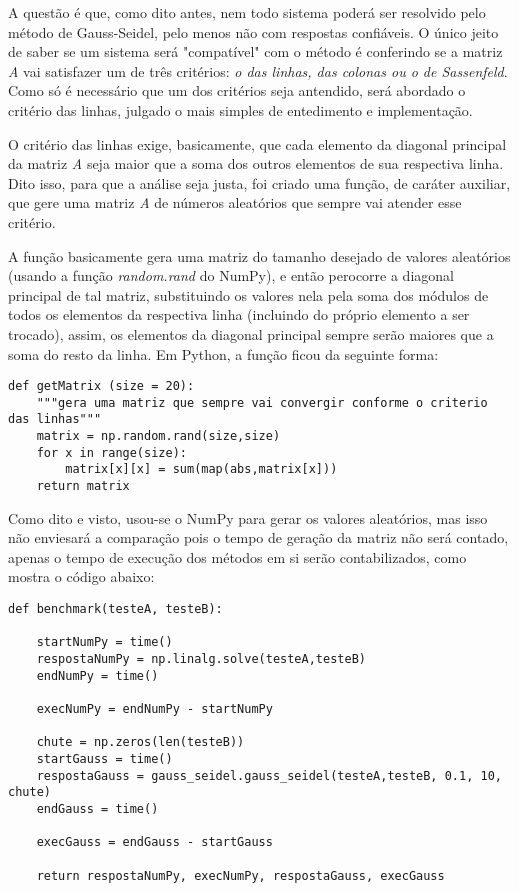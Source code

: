 \documentclass[12pt,A4]{report}
\begin{document}
A questão é que, como dito antes, nem todo sistema poderá ser resolvido pelo método de Gauss-Seidel, pelo menos não com respostas confiáveis. O único jeito de saber se um sistema será "compatível" com o método é conferindo se a matriz \textit{A} vai satisfazer um de três critérios: \textit{o das linhas, das colonas ou o de Sassenfeld}. Como só é necessário que um dos critérios seja antendido, será abordado o critério das linhas, julgado o mais simples de entedimento e implementação.

O critério das linhas exige, basicamente, que cada elemento da diagonal principal da matriz \textit{A} seja maior que a soma dos outros elementos de sua respectiva linha. Dito isso, para que a análise seja justa, foi criado uma função, de caráter auxiliar, que gere uma matriz \textit{A} de números aleatórios que sempre vai atender esse critério. 

A função basicamente gera uma matriz do tamanho desejado de valores aleatórios (usando a função \textit{random.rand} do NumPy), e então perocorre a diagonal principal de tal matriz, substituindo os valores nela pela soma dos módulos de todos os elementos da respectiva linha (incluindo do próprio elemento a ser trocado), assim, os elementos da diagonal principal sempre serão maiores que a soma do resto da linha. Em Python, a função ficou da seguinte forma:

\begin{lstlisting}[basicstyle=\tiny,]
def getMatrix (size = 20):
    """gera uma matriz que sempre vai convergir conforme o criterio das linhas"""
    matrix = np.random.rand(size,size)
    for x in range(size):
        matrix[x][x] = sum(map(abs,matrix[x]))
    return matrix
\end{lstlisting}

Como dito e visto, usou-se o NumPy para gerar os valores aleatórios, mas isso não enviesará a comparação pois o tempo de geração da matriz não será contado, apenas o tempo de execução dos métodos em si serão contabilizados, como mostra o código abaixo:

\begin{lstlisting}[basicstyle=\tiny,]
def benchmark(testeA, testeB):
    
    startNumPy = time()
    respostaNumPy = np.linalg.solve(testeA,testeB)
    endNumPy = time()

    execNumPy = endNumPy - startNumPy

    chute = np.zeros(len(testeB))
    startGauss = time()
    respostaGauss = gauss_seidel.gauss_seidel(testeA,testeB, 0.1, 10, chute)
    endGauss = time()
    
    execGauss = endGauss - startGauss
    
    return respostaNumPy, execNumPy, respostaGauss, execGauss
\end{lstlisting}
\end{document}
